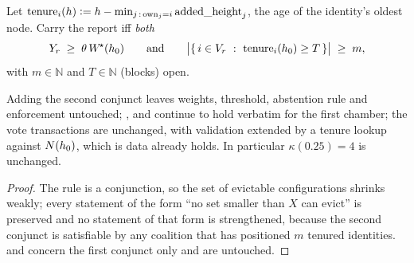 \begin{definition}
\label{def:23:twochamber}
Let $\mathrm{tenure}_i(h) \vcentcolon= h - \min_{j\,:\,\mathrm{own}_j = i}
\mathrm{added\_height}_j$, the age of the identity's oldest node. Carry the report iff \emph{both}
\[
Y_r \;\ge\; \theta\,W^{\!\star}(h_0)
\qquad\text{and}\qquad
\bigl\lvert\{\, i \in V_r \ :\ \mathrm{tenure}_i(h_0) \ge T \,\}\bigr\rvert \;\ge\; m,
\]
with $m \in \mathbb{N}$ and $T \in \mathbb{N}$ (blocks) open.
\end{definition}

\begin{proposition}
\label{prop:23:twochamber}
Adding the second conjunct leaves weights, threshold, abstention rule and enforcement untouched;
,  and  continue to hold verbatim
for the first chamber; the vote transactions are unchanged, with validation extended by a
tenure lookup against $N(h_0)$, which is data \fluxd{} already holds. In particular
$\kappa(0.25) = 4$ is unchanged.
\end{proposition}

\begin{proof}
The rule is a conjunction, so the set of evictable configurations shrinks weakly; every statement of
the form ``no set smaller than $X$ can evict'' is preserved and no statement of that form is
strengthened, because the second conjunct is satisfiable by any coalition that has positioned $m$
tenured identities.  and  concern the first conjunct only
and are untouched.
\end{proof}

